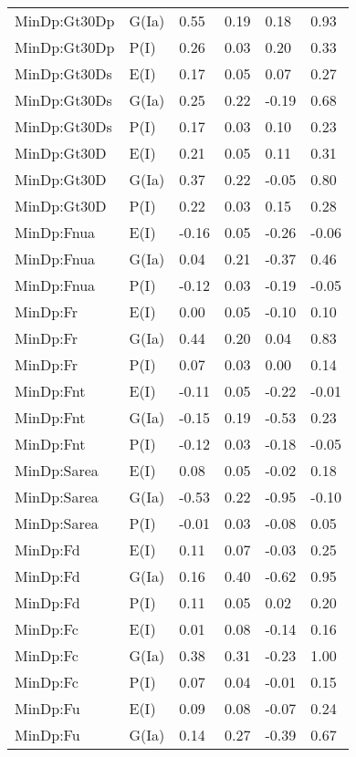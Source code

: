 \begin{center}
\begin{longtable}{|p{1.1in}|p{0.7in}|p{0.7in}|p{0.6in}|p{0.6in}|p{0.6in}|}
  MinDp:Gt30Dp & G(Ia) & 0.55 & 0.19 & 0.18 & 0.93 \\ 
  MinDp:Gt30Dp & P(I) & 0.26 & 0.03 & 0.20 & 0.33 \\ 
  MinDp:Gt30Ds & E(I) & 0.17 & 0.05 & 0.07 & 0.27 \\ 
  MinDp:Gt30Ds & G(Ia) & 0.25 & 0.22 & -0.19 & 0.68 \\ 
  MinDp:Gt30Ds & P(I) & 0.17 & 0.03 & 0.10 & 0.23 \\ 
  MinDp:Gt30D & E(I) & 0.21 & 0.05 & 0.11 & 0.31 \\ 
  MinDp:Gt30D & G(Ia) & 0.37 & 0.22 & -0.05 & 0.80 \\ 
  MinDp:Gt30D & P(I) & 0.22 & 0.03 & 0.15 & 0.28 \\ 
  MinDp:Fnua & E(I) & -0.16 & 0.05 & -0.26 & -0.06 \\ 
  MinDp:Fnua & G(Ia) & 0.04 & 0.21 & -0.37 & 0.46 \\ 
  MinDp:Fnua & P(I) & -0.12 & 0.03 & -0.19 & -0.05 \\ 
  MinDp:Fr & E(I) & 0.00 & 0.05 & -0.10 & 0.10 \\ 
  MinDp:Fr & G(Ia) & 0.44 & 0.20 & 0.04 & 0.83 \\ 
  MinDp:Fr & P(I) & 0.07 & 0.03 & 0.00 & 0.14 \\ 
  MinDp:Fnt & E(I) & -0.11 & 0.05 & -0.22 & -0.01 \\ 
  MinDp:Fnt & G(Ia) & -0.15 & 0.19 & -0.53 & 0.23 \\ 
  MinDp:Fnt & P(I) & -0.12 & 0.03 & -0.18 & -0.05 \\ 
  MinDp:Sarea & E(I) & 0.08 & 0.05 & -0.02 & 0.18 \\ 
  MinDp:Sarea & G(Ia) & -0.53 & 0.22 & -0.95 & -0.10 \\ 
  MinDp:Sarea & P(I) & -0.01 & 0.03 & -0.08 & 0.05 \\ 
  MinDp:Fd & E(I) & 0.11 & 0.07 & -0.03 & 0.25 \\ 
  MinDp:Fd & G(Ia) & 0.16 & 0.40 & -0.62 & 0.95 \\ 
  MinDp:Fd & P(I) & 0.11 & 0.05 & 0.02 & 0.20 \\ 
  MinDp:Fc & E(I) & 0.01 & 0.08 & -0.14 & 0.16 \\ 
  MinDp:Fc & G(Ia) & 0.38 & 0.31 & -0.23 & 1.00 \\ 
  MinDp:Fc & P(I) & 0.07 & 0.04 & -0.01 & 0.15 \\ 
  MinDp:Fu & E(I) & 0.09 & 0.08 & -0.07 & 0.24 \\ 
  MinDp:Fu & G(Ia) & 0.14 & 0.27 & -0.39 & 0.67 \\ 

\end{longtable}
\end{center}
